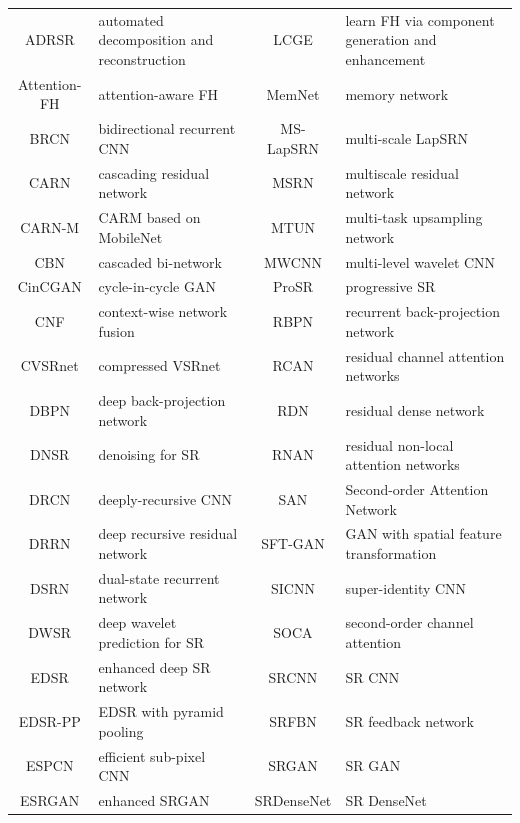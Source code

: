 {\begin{table}[h]
\begin{tabular}{|clcl|}
        \hline
        ADRSR  & automated decomposition and reconstruction     & LCGE  & learn FH via component generation and enhancement \\
        Attention-FH  & attention-aware FH                 & MemNet  & memory network \\
        BRCN  & bidirectional recurrent CNN & MS-LapSRN  & multi-scale LapSRN \\
        CARN  & cascading residual network                      & MSRN  & multiscale residual network \\
        CARN-M  & CARM based on MobileNet                       & MTUN  & multi-task upsampling network \\
        CBN  & cascaded bi-network                              & MWCNN  & multi-level wavelet CNN \\
        CinCGAN  & cycle-in-cycle GAN                 & ProSR  & progressive SR \\
        CNF  & context-wise network fusion                    & RBPN  & recurrent back-projection network \\
        CVSRnet  & compressed VSRnet                      & RCAN  & residual channel attention networks \\
        DBPN  & deep back-projection network                  & RDN  & residual dense network \\
        DNSR  & denoising for SR                                & RNAN  & residual non-local attention networks \\
        DRCN  & deeply-recursive CNN                          & SAN  & Second-order Attention Network \\
        DRRN  & deep recursive residual network                & SFT-GAN  & GAN with spatial feature transformation \\
        DSRN  & dual-state recurrent network                   & SICNN  & super-identity CNN \\
        DWSR  & deep wavelet prediction for SR                 & SOCA  & second-order channel attention \\
        EDSR  & enhanced deep SR network                   & SRCNN  & SR CNN \\
        EDSR-PP  & EDSR with pyramid pooling             & SRFBN  & SR feedback network \\
        ESPCN  & efficient sub-pixel CNN                  & SRGAN  & SR GAN \\
        ESRGAN  & enhanced SRGAN                            & SRDenseNet  & SR DenseNet \\

\end{tabular}
\end{table}}
